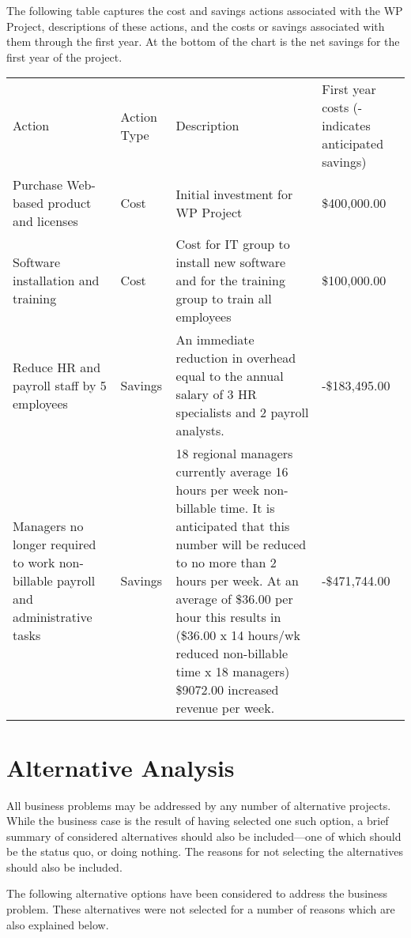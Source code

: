 \documentclass[11pt]{article}
\begin{document}
The following table captures the cost and savings actions associated with the WP Project, descriptions of these actions, and the costs or savings associated with them through the first year. At the bottom of the chart is the net savings for the first year of the project.

\begin{center}
\begin{tabular}{llll}
Action & Action Type & Description & First year costs (- indicates anticipated savings)\\
Purchase Web-based product and licenses & Cost & Initial investment for WP Project & \$400,000.00\\
Software installation and training & Cost & Cost for IT group to install new software and for the training group to train all employees & \$100,000.00\\
Reduce HR and payroll staff by 5 employees & Savings & An immediate reduction in overhead equal to the annual salary of 3 HR specialists and 2 payroll analysts. & -\$183,495.00\\
Managers no longer required to work non-billable payroll and administrative tasks & Savings & 18 regional managers currently average 16 hours per week non-billable time. It is anticipated that this number will be reduced to no more than 2 hours per week. At an average of \$36.00 per hour this results in (\$36.00 x 14 hours/wk reduced non-billable time x 18 managers) \$9072.00 increased revenue per week. & -\$471,744.00\\
\end{tabular}
\end{center}

\section{Alternative Analysis}
\label{sec:org7b39ce6}
All business problems may be addressed by any number of alternative projects. While the business case is the result of having selected one such option, a brief summary of considered alternatives should also be included—one of which should be the status quo, or doing nothing. The reasons for not selecting the alternatives should also be included.

The following alternative options have been considered to address the business problem. These alternatives were not selected for a number of reasons which are also explained below.
\end{document}
